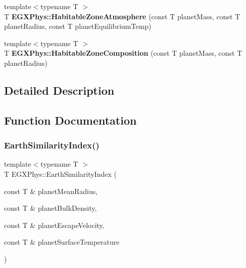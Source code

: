 \begin{DoxyCompactItemize}
\item 
\mbox{\label{group___e_g_x_phys-_planet_criteria_ga0814237dccfe3c968b97fa6c93aeca27}} 
{\footnotesize template$<$typename T $>$ }\\T {\bfseries E\+G\+X\+Phys\+::\+Habitable\+Zone\+Atmosphere} (const T planet\+Mass, const T planet\+Radius, const T planet\+Equilibrium\+Temp)
\item 
\mbox{\label{group___e_g_x_phys-_planet_criteria_ga14ab036f8c617512236522c8e31dd072}} 
{\footnotesize template$<$typename T $>$ }\\T {\bfseries E\+G\+X\+Phys\+::\+Habitable\+Zone\+Composition} (const T planet\+Mass, const T planet\+Radius)
\end{DoxyCompactItemize}


\subsection{Detailed Description}


\subsection{Function Documentation}
\mbox{\label{group___e_g_x_phys-_planet_criteria_ga4b86397b1c839c49ac599d49fda207d4}} 
\subsubsection{\texorpdfstring{Earth\+Similarity\+Index()}{EarthSimilarityIndex()}}
{\footnotesize\ttfamily template$<$typename T $>$ \\
T E\+G\+X\+Phys\+::\+Earth\+Similarity\+Index (\begin{DoxyParamCaption}\item[{const T \&}]{planet\+Mean\+Radius,  }\item[{const T \&}]{planet\+Bulk\+Density,  }\item[{const T \&}]{planet\+Escape\+Velocity,  }\item[{const T \&}]{planet\+Surface\+Temperature }\end{DoxyParamCaption})}



